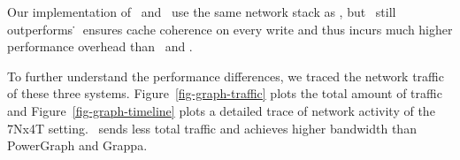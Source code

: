 Our implementation of \dsmxact\ and \dsmnoxact\ use the same network stack as \hotpot,
but \hotpot\ still outperforms \dsmnoxact\.
\dsmnoxact\ ensures cache coherence on every write and thus incurs much higher performance overhead than \hotpot\ and \dsmxact.

To further understand the performance differences, we traced the network traffic of these three systems.
Figure~\ref{fig-graph-traffic} plots the total amount of traffic %
and Figure~\ref{fig-graph-timeline} plots a detailed trace of network activity of the 7Nx4T setting.
\hotpot\ sends less total traffic and achieves higher bandwidth than PowerGraph and Grappa.
